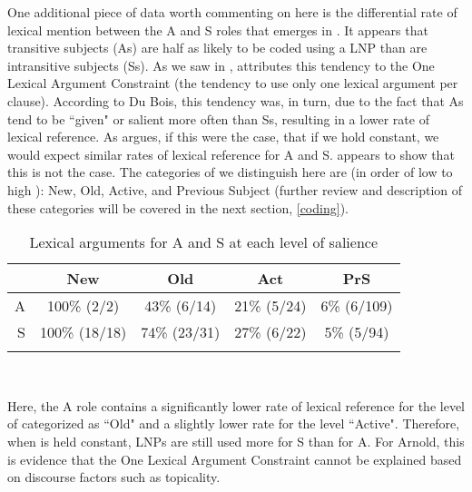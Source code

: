 One additional piece of data worth commenting on here is the differential rate of lexical mention between the A and S roles that emerges in . It appears that transitive subjects (As) are half as likely to be coded using a LNP than are intransitive subjects (Ss). As we saw in , \citet{dubois1987} attributes this tendency to the One Lexical Argument Constraint (the tendency to use only one lexical argument per clause). According to Du Bois, this tendency was, in turn, due to the fact that As tend to be ``given" or salient more often than Ss, resulting in a lower rate of lexical reference. As \citet[237]{arnold2003} argues, if this were the case, that if we hold  constant, we would expect similar rates of lexical reference for A and S.  appears to show that this is not the case. The categories of  we distinguish here are (in order of low to high ): New, Old, Active, and Previous Subject (further review and description of these categories will be covered in the next section, \ref{coding}). 

\begin{table} 

\caption{{Lexical arguments for A and S at each level of salience}}
\begin{tabular}{ r  c  c  c  c }
\lsptoprule
 & New & Old & Act & PrS \\

\midrule
 A & 100{\%} (2/2) & 43{\%} (6/14) & 21{\%} (5/24)  & 6{\%} (6/109) \\

 
S & 100{\%} (18/18) & 74{\%} (23/31) & 27{\%} (6/22) & 5{\%} (5/94) \\

\lspbottomrule
\end{tabular}\\
\label{ASsalience}

\end{table}

\newpage 
Here, the A role contains a significantly lower rate of lexical reference for the level of  categorized as ``Old" and a slightly lower rate for the level ``Active". Therefore, when  is held constant, LNPs are still used more for S than for A. For Arnold, this is evidence that the One Lexical Argument Constraint cannot be explained based on discourse factors such as topicality.

